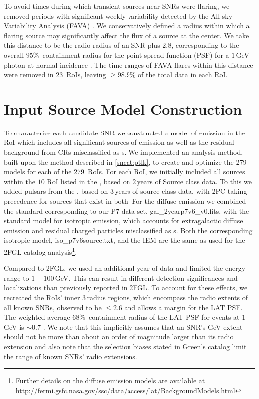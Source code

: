 To avoid times during which transient sources near SNRs were flaring, we removed periods with significant weekly variability detected by the \Fermi{} All-sky Variability Analysis (FAVA) \citep{fava13}. We conservatively defined a radius within which a flaring source may significantly affect the flux of a source at the center. We take this distance to be the radio radius of an SNR plus $2.8$\degr, corresponding to the overall $95\%$~containment radius for the \FermiLat{} point spread function (PSF) for a $1$\,GeV photon at normal incidence \citep{lat_perf}. The time ranges of FAVA flares within this distance were removed in $23$~RoIs, leaving $\geq 98.9\%$ of the total data in each RoI.

\section{Input Source Model Construction}\label{snrcat:AddSrcs}
To characterize each candidate SNR we constructed a model of \gam{} emission in the RoI which includes all significant sources of emission as well as the residual background from CRs misclassified as \gam{}s. We implemented an analysis method, built upon the \srcs{} method described in \ref{sncat:ptlk}, to create and optimize the 279 models for each of the $279$~RoIs. For each RoI, we initially included all sources within the $10$\degr{} RoI listed in the \twofgl{} \citep{2FGL}, based on $2$\,years of Source class data. To this we added pulsars from the \twopc{} \citep{2PC}, based on $3$\,years of source class data, with 2PC taking precedence for sources that exist in both. 
For the diffuse emission we combined the standard \iem{} corresponding to our P7 data set, gal\_2yearp7v6\_v0.fits, with the standard model for isotropic emission, which accounts for extragalactic diffuse \gam{} emission and residual charged particles misclassified as \gam{}s. Both the corresponding isotropic model, iso\_p7v6source.txt, and the IEM are the same as used for the 2FGL catalog analysis\footnote{Further details on the diffuse emission models are available at \url{http://fermi.gsfc.nasa.gov/ssc/data/access/lat/BackgroundModels.html} \jamie{and in Chapter blah]}}. 

Compared to 2FGL, we used an additional year of data and limited the energy range to $1-100$\,GeV. This can result in different detection significances and localizations than previously reported in 2FGL. To account for these effects, we recreated the RoIs' inner $3$\degr{}\,radius regions, which encompass the radio extents of all known SNRs, observed to be $\leq 2.6$\degr{} and allows a margin for the LAT PSF. The weighted average $68\%$~containment radius of the LAT PSF for events at $1$\,GeV is $\sim0.7$\degr{} \citep{lat_perf}. We note that this implicitly assumes that an SNR's GeV extent should not be more than about an order of magnitude larger than its radio extension and also note that the selection biases stated in Green's catalog limit the range of known SNRs' radio extensions. 

